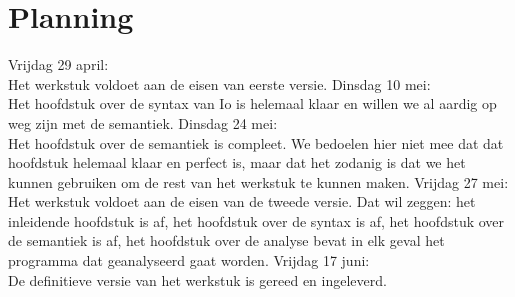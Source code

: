 \documentclass[12pt]{article}
\begin{document}
\appendix

\section{Planning}
Vrijdag 29 april: \\Het werkstuk voldoet aan de eisen van eerste versie.\newline\newline %
Dinsdag 10 mei: \\Het hoofdstuk over de syntax van Io is helemaal klaar en willen we al aardig op weg zijn met de semantiek.\newline\newline
Dinsdag 24 mei: \\Het hoofdstuk over de semantiek is compleet. We bedoelen hier niet mee dat dat hoofdstuk helemaal klaar en perfect is, maar
dat het zodanig is dat we het kunnen gebruiken om de rest van het werkstuk te kunnen maken.\newline\newline
Vrijdag 27 mei: \\Het werkstuk voldoet aan de eisen van de tweede versie. Dat wil zeggen: het inleidende hoofdstuk is af, het hoofdstuk over de syntax is af, het hoofdstuk over de semantiek is af, het hoofdstuk over de analyse bevat in elk geval het programma dat geanalyseerd gaat worden.\newline\newline
Vrijdag 17 juni: \\De definitieve versie van het werkstuk is gereed en ingeleverd.
\end{document}
